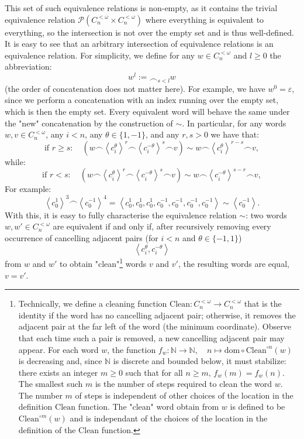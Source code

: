 \documentclass[11pt, a4paper, oneside]{article}
\theoremstyle{remark}
\theoremstyle{lemma}
\begin{document}
This set of such equivalence relations is non-empty, as it contains the trivial equivalence relation \(\mathscr{P}\left(C_{n}^{<\omega} \times C_{n}^{<\omega}\right)\) where everything is equivalent to everything, so the intersection is not over the empty set and is thus well-defined. It is easy to see that an arbitrary intersection of equivalence relations is an equivalence relation. For simplicity, we define for any $w \in C_n^{<\omega}$ and $l \geq 0$ the abbreviation:
$$w^l := \frown_{s < l} w$$ (the order of concatenation does not matter here). For example, we have $w^0 = \varepsilon$, since we perform a concatenation with an index running over the empty set, which is then the empty set. Every equivalent word will behave the same under the "new" concatenation by the construction of $\sim$. In particular, for any words $w, v \in C_n^{<\omega}$, any $i < n$, any $\theta\in\{1,-1\}$, and any $r, s > 0$ we have that:
\[
\text{if } r \geq s: \quad \left(w \frown \left\langle c_i^{\theta} \right\rangle^{r} \frown \left\langle c_{i}^{-\theta} \right\rangle^{s} \frown v\right) \sim w \frown \left\langle c_i^{\theta} \right\rangle^{r - s} \frown v,
\]
while:
\[
\text{if } r < s: \quad \left(w \frown \left\langle c_i^{\theta} \right\rangle^{r} \frown \left\langle c_{i}^{-\theta} \right\rangle^{s} \frown v\right) \sim w \frown \left\langle c_i^{-\theta} \right\rangle^{s - r} \frown v,
\]
For example:
\[
\left\langle c_0^{1} \right\rangle^{3} \frown \left\langle c_{0}^{-1} \right\rangle^{4} = \left\langle c_0^{1}, c_0^{1}, c_0^{1}, c_0^{-1}, c_0^{-1}, c_0^{-1}, c_0^{-1} \right\rangle \sim \left\langle c_{0}^{-1} \right\rangle.
\]
With this, it is easy to fully characterise the equivalence relation \(\sim\): two words \(w, w' \in C_n^{<\omega}\) are equivalent if and only if, after recursively removing every occurrence of cancelling adjacent pairs (for \(i<n\) and \(\theta\in\{-1,1\}\))
\[
\left\langle c_i^{\theta}, c_i^{-\theta} \right\rangle
\]
from \(w\) and \(w'\) to obtain "clean"\footnote{Technically, we define a cleaning function 
\(\mathrm{Clean}: C_n^{<\omega} \rightarrow C_n^{<\omega}\) 
that is the identity if the word has no cancelling adjacent pair; otherwise, it removes the adjacent pair at the far left of the word (the minimum coordinate). Observe that each time such a pair is removed, a new cancelling adjacent pair may appear. For each word $w$, the function \(f_w: \mathbb{N} \rightarrow \mathbb{N}, \quad n \mapsto \mathrm{dom} \circ \mathrm{Clean}^{\circ n}(w)\) is decreasing and, since $\mathbb{N}$ is discrete and bounded below, it must stabilize: there exists an integer $m \geq 0$ such that for all $n \geq m$, $f_w(m) = f_w(n)$. The smallest such $m$ is the number of steps required to clean the word $w$. The number $m$ of steps is independent of other choices of the location in the definition \(\mathrm{Clean}\) function. The "clean" word obtain from $w$ is defined to be $\mathrm{Clean}^{\circ m}(w)$ and is independant of the choices of the location in the definition of the \(\mathrm{Clean}\) function.} words \(v\) and \(v'\), the resulting words are equal, \(v = v'\).
\end{document}
